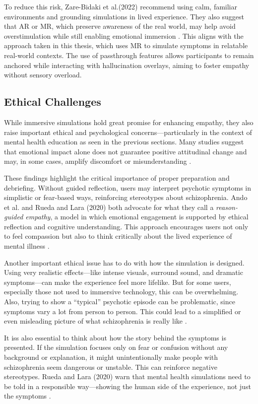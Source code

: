 To reduce this risk, Zare-Bidaki et al.(2022) recommend using calm, familiar environments and grounding simulations in lived experience. They also suggest that AR or MR, which preserve awareness of the real world, may help avoid overstimulation while still enabling emotional immersion \cite{Zare-Bidaki2022}. This aligns with the approach taken in this thesis, which uses MR to simulate symptoms in relatable real-world contexts. The use of passthrough features allows participants to remain anchored while interacting with hallucination overlays, aiming to foster empathy without sensory overload.

\subsection{Ethical Challenges}

While immersive simulations hold great promise for enhancing empathy, they also raise important ethical and psychological concerns—particularly in the context of mental health education as seen in the previous sections. Many studies suggest that emotional impact alone does not guarantee positive attitudinal change and may, in some cases, amplify discomfort or misunderstanding \cite{Ando2011}.

These findings highlight the critical importance of proper preparation and debriefing. Without guided reflection, users may interpret psychotic symptoms in simplistic or fear-based ways, reinforcing stereotypes about schizophrenia. Ando et al. and Rueda and Lara (2020) both advocate for what they call a \textit{reason-guided empathy}, a model in which emotional engagement is supported by ethical reflection and cognitive understanding. This approach encourages users not only to feel compassion but also to think critically about the lived experience of mental illness \cite{Ando2011, Rueda2020}.

Another important ethical issue has to do with how the simulation is designed. Using very realistic effects—like intense visuals, surround sound, and dramatic symptoms—can make the experience feel more lifelike. But for some users, especially those not used to immersive technology, this can be overwhelming. Also, trying to show a “typical” psychotic episode can be problematic, since symptoms vary a lot from person to person. This could lead to a simplified or even misleading picture of what schizophrenia is really like \cite{Zare-Bidaki2022}.

It iss also essential to think about how the story behind the symptoms is presented. If the simulation focuses only on fear or confusion without any background or explanation, it might unintentionally make people with schizophrenia seem dangerous or unstable. This can reinforce negative stereotypes. Rueda and Lara (2020) warn that mental health simulations need to be told in a responsible way—showing the human side of the experience, not just the symptoms \cite{Rueda2020}.


